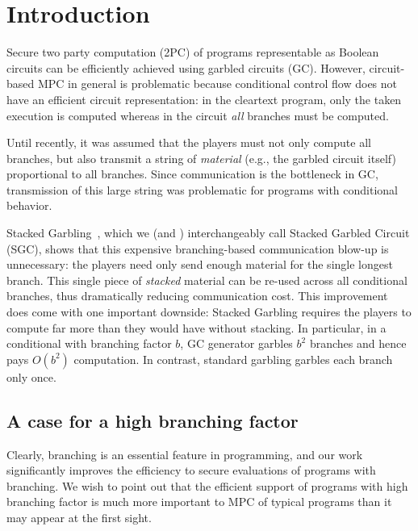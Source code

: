 \section{Introduction}\label{sec:intro}

Secure two party computation (2PC) of programs representable as Boolean circuits can be efficiently achieved using garbled circuits (GC).
%
However,  circuit-based MPC in general is problematic because conditional
control flow does not have an efficient circuit representation:
in the cleartext program, only the taken execution is computed whereas in
the circuit \emph{all} branches must be computed.

%
Until recently, it was assumed that the players must not only compute
all branches, but also transmit a string of \emph{material} (e.g., the garbled circuit itself) 
proportional to all branches.  
Since communication is the bottleneck in GC, transmission of this large string was
problematic for programs with conditional behavior.

Stacked Garbling~\HK, which we (and \HK)  interchangeably call Stacked Garbled Circuit (SGC), shows that
this expensive branching-based communication blow-up is unnecessary: the players need only
send enough material for the single longest branch. This single
piece of \emph{stacked} material can be re-used across all conditional branches, thus
dramatically reducing communication cost.
%
This improvement does come with one important downside:
Stacked Garbling requires the players to compute far more than they
would have without stacking.
In particular, in a conditional with branching factor $b$, \HK GC generator garbles $b^2$ branches and hence pays $O(b^2)$ computation.  In contrast, standard garbling garbles each branch only once.


\subsection{A case for a high branching factor}

Clearly,   branching is an essential feature in programming, and our work significantly improves the efficiency to secure evaluations of programs with branching.
We wish to point out that the efficient support of programs with high branching factor is much more important to MPC of typical programs than it may appear at the first sight.  

